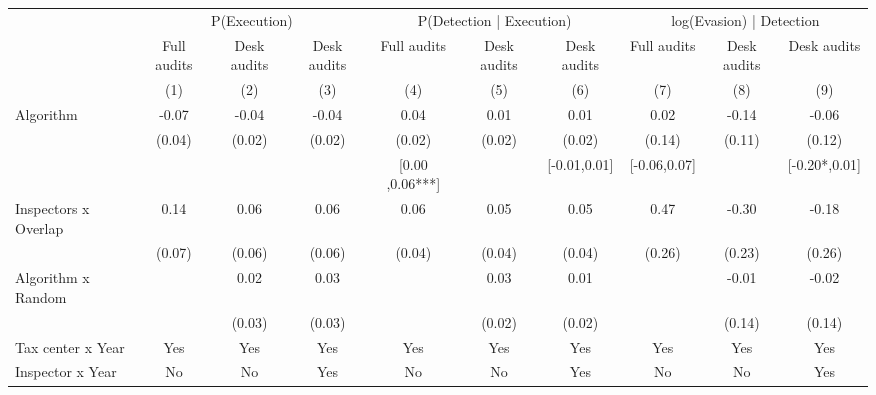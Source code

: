 \begin{tabular}{lccc|ccc|ccc} \toprule
\multicolumn{1}{l}{} & \multicolumn{3}{c}{P(Execution)} & \multicolumn{3}{c}{P(Detection | Execution)} & \multicolumn{3}{c}{log(Evasion) | Detection} \\\cmidrule(lr){2-4}\cmidrule(lr){5-7}\cmidrule(lr){8-10} \multicolumn{1}{l}{} & Full audits & Desk audits & Desk audits & Full audits & Desk audits & Desk audits & Full audits & Desk audits & Desk audits \\ \multicolumn{1}{l}{} & (1) & (2) & (3) & (4) & (5) & (6) & (7) & (8) & (9) \\ \midrule
Algorithm   &       -0.07\sym{*}  &       -0.04         &       -0.04         &        0.04\sym{**} &        0.01         &        0.01         &        0.02         &       -0.14         &       -0.06         \\
            &      (0.04)         &      (0.02)         &      (0.02)         &      (0.02)         &      (0.02)         &      (0.02)         &      (0.14)         &      (0.11)         &      (0.12)         \\
\addlinespace
 & & & & [0.00 ,0.06***] & & [-0.01,0.01] & [-0.06,0.07] & & [-0.20*,0.01] \\  Inspectors x Overlap&        0.14\sym{**} &        0.06         &        0.06         &        0.06\sym{*}  &        0.05         &        0.05         &        0.47\sym{*}  &       -0.30         &       -0.18         \\
            &      (0.07)         &      (0.06)         &      (0.06)         &      (0.04)         &      (0.04)         &      (0.04)         &      (0.26)         &      (0.23)         &      (0.26)         \\
\addlinespace
Algorithm x Random&                     &        0.02         &        0.03         &                     &        0.03         &        0.01         &                     &       -0.01         &       -0.02         \\
            &                     &      (0.03)         &      (0.03)         &                     &      (0.02)         &      (0.02)         &                     &      (0.14)         &      (0.14)         \\
\midrule
Tax center x Year&         Yes         &         Yes         &         Yes         &         Yes         &         Yes         &         Yes         &         Yes         &         Yes         &         Yes         \\
Inspector x Year&          No         &          No         &         Yes         &          No         &          No         &         Yes         &          No         &          No         &         Yes         \\

\end{tabular}
